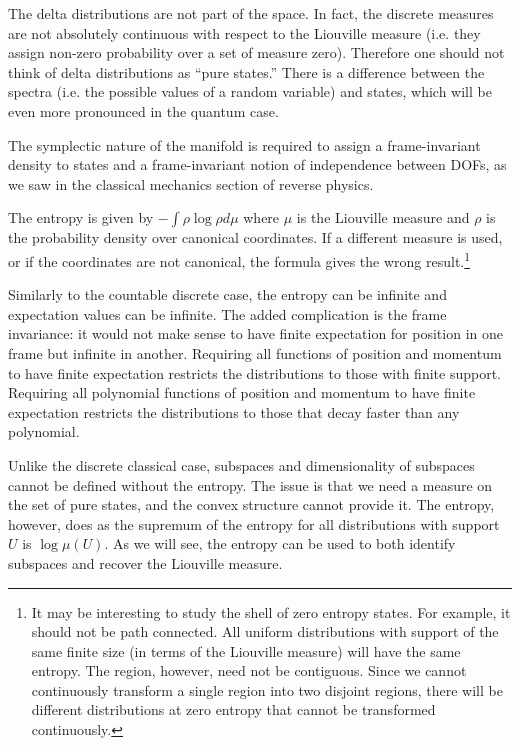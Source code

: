 The delta distributions are not part of the space. In fact, the discrete measures are not absolutely continuous with respect to the Liouville measure (i.e. they assign non-zero probability over a set of measure zero). Therefore one should not think of delta distributions as ``pure states.'' There is a difference between the spectra (i.e. the possible values of a random variable) and states, which will be even more pronounced in the quantum case.

The symplectic nature of the manifold is required to assign a frame-invariant density to states and a frame-invariant notion of independence between DOFs, as we saw in the classical mechanics section of reverse physics.

The entropy is given by $- \int \rho \log \rho d\mu$ where $\mu$ is the Liouville measure and $\rho$ is the probability density over canonical coordinates. If a different measure is used, or if the coordinates are not canonical, the formula gives the wrong result.\footnote{It may be interesting to study the shell of zero entropy states. For example, it should not be path connected. All uniform distributions with support of the same finite size (in terms of the Liouville measure) will have the same entropy. The region, however, need not be contiguous. Since we cannot continuously transform a single region into two disjoint regions, there will be different distributions at zero entropy that cannot be transformed continuously.}


Similarly to the countable discrete case, the entropy can be infinite and expectation values can be infinite. The added complication is the frame invariance: it would not make sense to have finite expectation for position in one frame but infinite in another. Requiring all functions of position and momentum to have finite expectation restricts the distributions to those with finite support. Requiring all polynomial functions of position and momentum to have finite expectation restricts the distributions to those that decay faster than any polynomial.

Unlike the discrete classical case, subspaces and dimensionality of subspaces cannot be defined without the entropy. The issue is that we need a measure on the set of pure states, and the convex structure cannot provide it. The entropy, however, does as the supremum of the entropy for all distributions with support $U$ is $\log \mu(U)$. As we will see, the entropy can be used to both identify subspaces and recover the Liouville measure.

